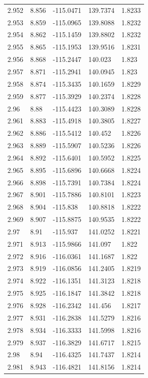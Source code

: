 \begin{tabular}{lllll}
2.952 & 8.856 & -115.0471 & 139.7374 & 1.8233 \\
2.953 & 8.859 & -115.0965 & 139.8088 & 1.8232 \\
2.954 & 8.862 & -115.1459 & 139.8802 & 1.8232 \\
2.955 & 8.865 & -115.1953 & 139.9516 & 1.8231 \\
2.956 & 8.868 & -115.2447 & 140.023 & 1.823 \\
2.957 & 8.871 & -115.2941 & 140.0945 & 1.823 \\
2.958 & 8.874 & -115.3435 & 140.1659 & 1.8229 \\
2.959 & 8.877 & -115.3929 & 140.2374 & 1.8228 \\
2.96 & 8.88 & -115.4423 & 140.3089 & 1.8228 \\
2.961 & 8.883 & -115.4918 & 140.3805 & 1.8227 \\
2.962 & 8.886 & -115.5412 & 140.452 & 1.8226 \\
2.963 & 8.889 & -115.5907 & 140.5236 & 1.8226 \\
2.964 & 8.892 & -115.6401 & 140.5952 & 1.8225 \\
2.965 & 8.895 & -115.6896 & 140.6668 & 1.8224 \\
2.966 & 8.898 & -115.7391 & 140.7384 & 1.8224 \\
2.967 & 8.901 & -115.7886 & 140.8101 & 1.8223 \\
2.968 & 8.904 & -115.838 & 140.8818 & 1.8222 \\
2.969 & 8.907 & -115.8875 & 140.9535 & 1.8222 \\
2.97 & 8.91 & -115.937 & 141.0252 & 1.8221 \\
2.971 & 8.913 & -115.9866 & 141.097 & 1.822 \\
2.972 & 8.916 & -116.0361 & 141.1687 & 1.822 \\
2.973 & 8.919 & -116.0856 & 141.2405 & 1.8219 \\
2.974 & 8.922 & -116.1351 & 141.3123 & 1.8218 \\
2.975 & 8.925 & -116.1847 & 141.3842 & 1.8218 \\
2.976 & 8.928 & -116.2342 & 141.456 & 1.8217 \\
2.977 & 8.931 & -116.2838 & 141.5279 & 1.8216 \\
2.978 & 8.934 & -116.3333 & 141.5998 & 1.8216 \\
2.979 & 8.937 & -116.3829 & 141.6717 & 1.8215 \\
2.98 & 8.94 & -116.4325 & 141.7437 & 1.8214 \\
2.981 & 8.943 & -116.4821 & 141.8156 & 1.8214 \\

\end{tabular}
